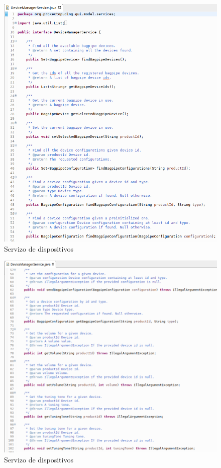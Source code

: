    \begin{figure}[htbp]
    \centering
    \includegraphics[scale=0.6, keepaspectratio=true]{./imagenes/servizo-dispositivos-1.png}
    \caption{Servizo de dispositivos}
    \label{figura:ServizoDispositivos1}
   \end{figure}
   
   \begin{figure}[htbp]
    \centering
    \includegraphics[scale=0.6, keepaspectratio=true]{./imagenes/servizo-dispositivos-2.png}
    \caption{Servizo de dispositivos}
    \label{figura:ServizoDispositivos2}
   \end{figure}
   
